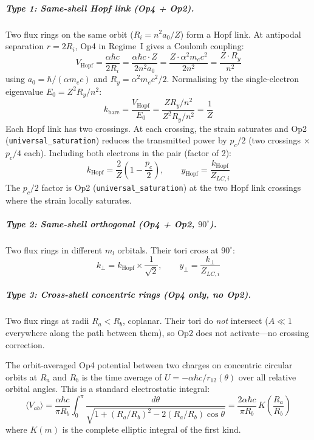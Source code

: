 \subparagraph{Type 1: Same-shell Hopf link (Op4 + Op2).}
Two flux rings on the same orbit ($R_i = n^2 a_0 / Z$) form
a Hopf link.  At antipodal separation $r = 2R_i$, Op4 in
Regime~I gives a Coulomb coupling:
\begin{equation}
    V_{\text{Hopf}} = \frac{\alpha\hbar c}{2 R_i}
    = \frac{\alpha\hbar c \cdot Z}{2 n^2 a_0}
    = \frac{Z \cdot \alpha^2 m_e c^2}{2 n^2}
    = \frac{Z \cdot R_y}{n^2}
\end{equation}
using $a_0 = \hbar/(\alpha m_e c)$ and $R_y = \alpha^2 m_e c^2/2$.
Normalising by the single-electron eigenvalue $E_0 = Z^2 R_y/n^2$:
\begin{equation}
    k_{\text{bare}} = \frac{V_{\text{Hopf}}}{E_0}
    = \frac{Z R_y / n^2}{Z^2 R_y / n^2} = \frac{1}{Z}
\end{equation}
Each Hopf link has two crossings.  At each crossing, the strain
saturates and Op2 (\texttt{universal\_\allowbreak saturation}) reduces the
transmitted power by $p_c/2$ (two crossings $\times$ $p_c/4$ each).
Including both electrons in the pair (factor of 2):
\begin{equation}
    k_{\text{Hopf}} = \frac{2}{Z}\left(1 - \frac{p_c}{2}\right),
    \qquad y_{\text{Hopf}} = \frac{k_{\text{Hopf}}}{Z_{LC,i}}
    \label{eq:y_hopf}
\end{equation}
The $p_c/2$ factor is Op2 (\texttt{universal\_saturation}) at the
two Hopf link crossings where the strain locally saturates.

\subparagraph{Type 2: Same-shell orthogonal (Op4 + Op2, $90^\circ$).}
Two flux rings in different $m_l$ orbitals. Their tori cross
at $90^\circ$:
\begin{equation}
    k_\perp = k_{\text{Hopf}} \times \frac{1}{\sqrt{2}},
    \qquad y_\perp = \frac{k_\perp}{Z_{LC,i}}
    \label{eq:y_perp}
\end{equation}

\subparagraph{Type 3: Cross-shell concentric rings (Op4 only, no Op2).}
Two flux rings at radii $R_a < R_b$, coplanar. Their tori do
\emph{not} intersect ($A \ll 1$ everywhere along the path between
them), so Op2 does not activate---no crossing correction.

The orbit-averaged Op4 potential between two charges on
concentric circular orbits at $R_a$ and $R_b$ is the
time average of $U = -\alpha\hbar c / r_{12}(\theta)$
over all relative orbital angles.  This is a standard
electrostatic integral:
\begin{equation}
    \langle V_{ab} \rangle
    = \frac{\alpha\hbar c}{\pi R_b}
    \int_0^\pi
    \frac{d\theta}{\sqrt{1 + (R_a/R_b)^2 - 2(R_a/R_b)\cos\theta}}
    = \frac{2\alpha\hbar c}{\pi R_b}\,
    K\!\left(\frac{R_a}{R_b}\right)
    \label{eq:ring_coulomb}
\end{equation}
where $K(m)$ is the complete elliptic integral of the first kind.

